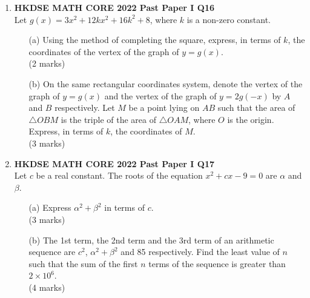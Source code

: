 \documentclass[12pt]{article}
\begin{document}
\begin{enumerate}
	\item \textbf{HKDSE MATH CORE 2022 Past Paper I Q16}\\
	Let $g(x) = 3x^2 + 12kx^2 + 16k^2 + 8$, where $k$ is a non-zero constant.
	\begin{enumerate}
		\item[(a)] Using the method of completing the square, express, in terms of $k$, the coordinates of the vertex of the graph of $y = g(x)$. \\(2 marks) 
		\item[(b)] On the same rectangular coordinates system, denote the vertex of the graph of $y = g(x)$ and the vertex of the graph of $y = 2g(-x)$ by $A$ and $B$ respectively. Let $M$ be a point lying on $AB$ such that the area of $\triangle OBM$ is the triple of the area of $\triangle OAM$, where $O$ is the origin. Express, in terms of $k$, the coordinates of $M$. \\(3 marks)
	\end{enumerate}

	\item \textbf{HKDSE MATH CORE 2022 Past Paper I Q17}\\
	Let $c$ be a real constant. The roots of the equation $x^2 + cx - 9 = 0$ are $\alpha$ and $\beta$.
	\begin{enumerate}
		\item[(a)] Express $\alpha^2 + \beta^2$ in terms of $c$. \\(3 marks)
		\item[(b)] The 1st term, the 2nd term and the 3rd term of an arithmetic sequence are $c^2$, $\alpha^2 + \beta^2$ and 85 respectively. Find the least value of $n$ such that the sum of the first $n$ terms of the sequence is greater than $2 \times 10^6$. \\(4 marks)
	\end{enumerate}


\end{enumerate}
\end{document}
